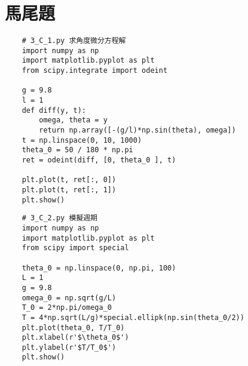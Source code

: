 \documentclass[UTF8,a4paper,12pt]{article}
\begin{document}
\newpage

\section{馬尾題}

\begin{lstlisting}
    # 3_C_1.py 求角度微分方程解
    import numpy as np
    import matplotlib.pyplot as plt
    from scipy.integrate import odeint
    
    g = 9.8
    l = 1
    def diff(y, t):
        omega, theta = y
        return np.array([-(g/l)*np.sin(theta), omega])
    t = np.linspace(0, 10, 1000)
    theta_0 = 50 / 180 * np.pi
    ret = odeint(diff, [0, theta_0 ], t)
    
    plt.plot(t, ret[:, 0])
    plt.plot(t, ret[:, 1])
    plt.show()
\end{lstlisting}

\newpage

\begin{lstlisting}
    # 3_C_2.py 模擬週期
    import numpy as np
    import matplotlib.pyplot as plt
    from scipy import special
    
    theta_0 = np.linspace(0, np.pi, 100)
    L = 1
    g = 9.8
    omega_0 = np.sqrt(g/L)
    T_0 = 2*np.pi/omega_0
    T = 4*np.sqrt(L/g)*special.ellipk(np.sin(theta_0/2))
    plt.plot(theta_0, T/T_0)
    plt.xlabel(r'$\theta_0$')
    plt.ylabel(r'$T/T_0$')
    plt.show()
    
\end{lstlisting}

\newpage
\end{document}
